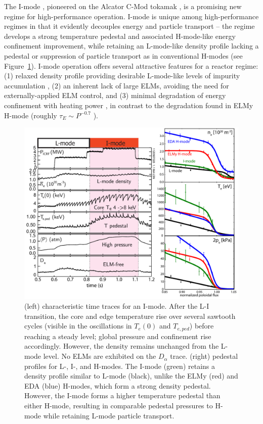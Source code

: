 \documentclass[12pt]{iopart}
\begin{document}
The I-mode \cite{Whyte2010,Hubbard2011,Walk2014,Walk2014b}, pioneered on the Alcator C-Mod tokamak \cite{Hutchinson1994}, is a promising new regime for high-performance operation.  
I-mode is unique among high-performance regimes in that it evidently decouples energy and particle transport -- the regime develops a strong temperature pedestal and associated H-mode-like energy confinement improvement, while retaining an L-mode-like density profile lacking a pedestal or suppression of particle transport as in conventional H-modes (see Figure~\ref{fig:imode_trace}).
I-mode operation offers several attractive features for a reactor regime: (1) relaxed density profile providing desirable L-mode-like levels of impurity accumulation \cite{Howard2011}, (2) an inherent lack of large ELMs, avoiding the need for externally-applied ELM control, and (3) minimal degradation of energy confinement with heating power \cite{Whyte2010,Dominguez2012}, in contrast to the degradation found in ELMy H-mode (roughly $\tau_E \sim P^{-0.7}$ \cite{ITER1999,Christiansen1992}).

\begin{figure}[ht]
 \centering
 \includegraphics[width=\textwidth]{pdfgraphics/trace_imode.pdf}
 \caption{(left) characteristic time traces for an I-mode.  After the L-I transition, the core and edge temperature rise over several sawtooth cycles (visible in the oscillations in $T_e(0)$ and $T_{e,ped}$) before reaching a steady level; global pressure and confinement rise accordingly.  However, the density remains unchanged from the L-mode level.  No ELMs are exhibited on the $D_\alpha$ trace.  (right) pedestal profiles for L-, I-, and H-modes.  The I-mode (green) retains a density profile similar to L-mode (black), unlike the ELMy (red) and EDA (blue) H-modes, which form a strong density pedestal.  However, the I-mode forms a higher temperature pedestal than either H-mode, resulting in comparable pedestal pressures to H-mode while retaining L-mode particle transport.}
 \label{fig:imode_trace}
\end{figure}
\end{document}
